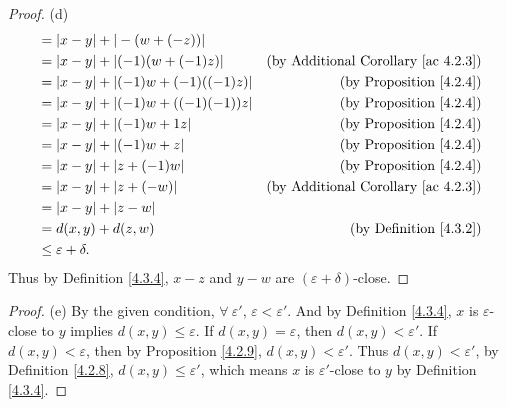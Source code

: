 \begin{proof}{(d)}
\begin{align*}
&= |x - y| + |-(w + (-z))| \\
&= |x - y| + |(-1)(w + (-1)z)| & \text{(by Additional Corollary \ref{ac 4.2.3})} \\
&= |x - y| + |(-1)w + (-1)((-1)z)| & \text{(by Proposition \ref{4.2.4})} \\
&= |x - y| + |(-1)w + ((-1)(-1))z| & \text{(by Proposition \ref{4.2.4})} \\
&= |x - y| + |(-1)w + 1z| & \text{(by Proposition \ref{4.2.4})} \\
&= |x - y| + |(-1)w + z| & \text{(by Proposition \ref{4.2.4})} \\
&= |x - y| + |z + (-1)w| & \text{(by Proposition \ref{4.2.4})} \\
&= |x - y| + |z + (-w)| & \text{(by Additional Corollary \ref{ac 4.2.3})} \\
&= |x - y| + |z - w| \\
&= d(x, y) + d(z, w) & \text{(by Definition \ref{4.3.2})} \\
&\leq \varepsilon + \delta. \\
\end{align*}
Thus by Definition \ref{4.3.4}, \(x - z\) and \(y - w\) are \((\varepsilon + \delta)\)-close.
\end{proof}

\begin{proof}{(e)}
By the given condition, \(\forall\ \varepsilon'\), \(\varepsilon < \varepsilon'\).
And by Definition \ref{4.3.4}, \(x\) is \(\varepsilon\)-close to \(y\) implies \(d(x, y) \leq \varepsilon\).
If \(d(x, y) = \varepsilon\), then \(d(x, y) < \varepsilon'\).
If \(d(x, y) < \varepsilon\), then by Proposition \ref{4.2.9}, \(d(x, y) < \varepsilon'\).
Thus \(d(x, y) < \varepsilon'\), by Definition \ref{4.2.8}, \(d(x, y) \leq \varepsilon'\), which means \(x\) is \(\varepsilon'\)-close to \(y\) by Definition \ref{4.3.4}.
\end{proof}

